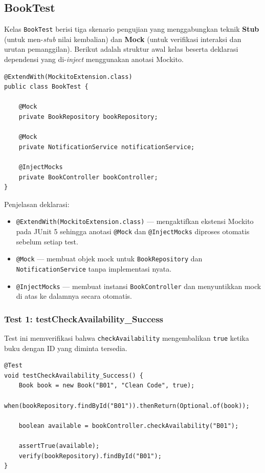 \documentclass[a4paper,oneside,12pt]{report}
\begin{document}
\subsection{BookTest}

Kelas \texttt{BookTest} berisi tiga skenario pengujian yang menggabungkan teknik \textbf{Stub} (untuk men-\textit{stub} nilai kembalian) dan \textbf{Mock} (untuk verifikasi interaksi dan urutan pemanggilan). Berikut adalah struktur awal kelas beserta deklarasi dependensi yang di-\textit{inject} menggunakan anotasi Mockito.

\begin{lstlisting}[style=javastyle, caption={BookTest.java -- Deklarasi Kelas dan Anotasi}]
@ExtendWith(MockitoExtension.class)
public class BookTest {

    @Mock
    private BookRepository bookRepository;

    @Mock
    private NotificationService notificationService;

    @InjectMocks
    private BookController bookController;
}
\end{lstlisting}

Penjelasan deklarasi:
\begin{itemize}
    \item \texttt{@ExtendWith(MockitoExtension.class)} --- mengaktifkan ekstensi Mockito pada JUnit 5 sehingga anotasi \texttt{@Mock} dan \texttt{@InjectMocks} diproses otomatis sebelum setiap test.
    \item \texttt{@Mock} --- membuat objek mock untuk \texttt{BookRepository} dan \texttt{NotificationService} tanpa implementasi nyata.
    \item \texttt{@InjectMocks} --- membuat instansi \texttt{BookController} dan menyuntikkan mock di atas ke dalamnya secara otomatis.
\end{itemize}

\subsubsection{Test 1: testCheckAvailability\_Success}

Test ini memverifikasi bahwa \texttt{checkAvailability} mengembalikan \texttt{true} ketika buku dengan ID yang diminta tersedia.

\begin{lstlisting}[style=javastyle, caption={BookTest.java -- testCheckAvailability\_Success}]
@Test
void testCheckAvailability_Success() {
    Book book = new Book("B01", "Clean Code", true);
    when(bookRepository.findById("B01")).thenReturn(Optional.of(book));

    boolean available = bookController.checkAvailability("B01");

    assertTrue(available);
    verify(bookRepository).findById("B01");
}
\end{lstlisting}
\end{document}
